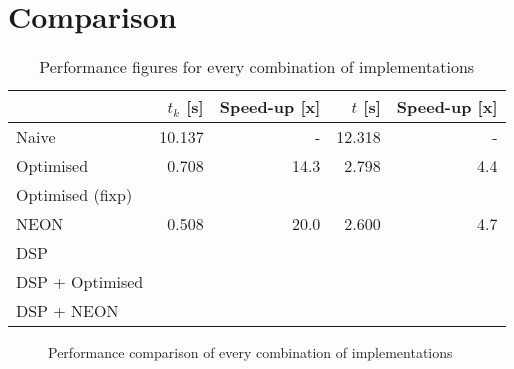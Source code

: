 \documentclass[final]{article}
\begin{document}
\section{Comparison}
\label{sec:comparison}

\begin{table}[H]
	\centering
	\caption{Performance figures for every combination of implementations}
	\begin{tabular}{lrrrr}
		\toprule
							& $t_k$ [s]	& Speed-up [x]	& $t$ [s]	& Speed-up [x]	\\
		\midrule
		Naive				& 10.137	& -			 	& 12.318	& -				\\
		Optimised			&  0.708	& 14.3		 	&  2.798	& 4.4			\\
		Optimised (fixp)	& 			& 			 	& 			& 				\\
		NEON				&  0.508	& 20.0		 	&  2.600	& 4.7			\\
		DSP					& 			& 			 	& 			& 				\\
		DSP + Optimised		& 			& 			 	& 			& 				\\
		DSP + NEON			& 			& 			 	& 			& 				\\
		\bottomrule
	\end{tabular}
	\label{tab:comparison}
\end{table}

\setlength\figureheight{6cm}
\setlength\figurewidth{9cm}
\begin{figure}[H]
	\centering
	
	\caption{Performance comparison of every combination of implementations}
	\label{fig:comparison}
\end{figure}
\end{document}
